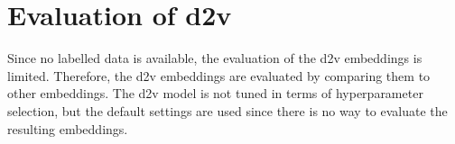 \section{Evaluation of \ac{d2v}}\label{sec:evaluation-doc2vec}

Since no labelled data is available, the evaluation of the \ac{d2v} embeddings is limited.
Therefore, the \ac{d2v} embeddings are evaluated by comparing them to other embeddings.
The \ac{d2v} model is not tuned in terms of hyperparameter selection,
but the default settings are used since there is no way to evaluate the resulting embeddings.
